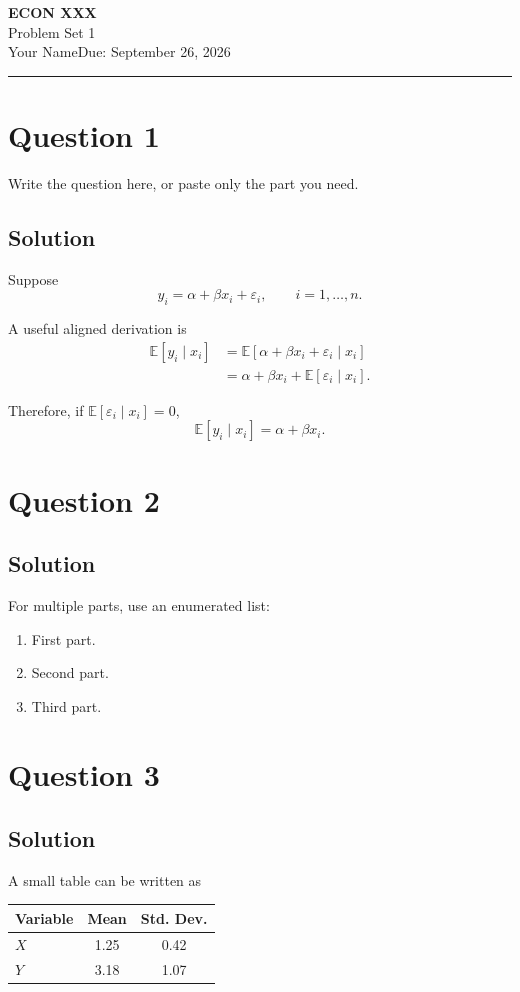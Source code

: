 \documentclass[11pt]{article}
\newcommand{\E}{\mathbb{E}}
\newcommand{\coursename}{ECON XXX}
\newcommand{\assignment}{Problem Set 1}
\newcommand{\studentname}{Your Name}
\newcommand{\duedate}{September 26, 2026}
\begin{document}
\begin{center}
    {\Large \textbf{\coursename}}\\[0.4em]
    {\large \assignment}\\[0.8em]
    \studentname \hfill Due: \duedate
\end{center}

\hrule
\vspace{1em}

\section*{Question 1}
Write the question here, or paste only the part you need.

\subsection*{Solution}
Suppose
\begin{equation}
    y_i = \alpha + \beta x_i + \varepsilon_i,
    \qquad i=1,\ldots,n.
\end{equation}

A useful aligned derivation is
\begin{align}
    \E[y_i\mid x_i]
        &= \E[\alpha + \beta x_i + \varepsilon_i \mid x_i] \\
        &= \alpha + \beta x_i + \E[\varepsilon_i\mid x_i].
\end{align}

Therefore, if $\E[\varepsilon_i\mid x_i]=0$,
\[
    \E[y_i\mid x_i] = \alpha + \beta x_i.
\]

\section*{Question 2}

\subsection*{Solution}
For multiple parts, use an enumerated list:
\begin{enumerate}[label=(\alph*)]
    \item First part.
    \item Second part.
    \item Third part.
\end{enumerate}

\section*{Question 3}

\subsection*{Solution}
A small table can be written as
\begin{center}
\begin{tabular}{lcc}
\toprule
Variable & Mean & Std. Dev. \\
\midrule
$X$ & 1.25 & 0.42 \\
$Y$ & 3.18 & 1.07 \\
\bottomrule
\end{tabular}
\end{center}
\end{document}
